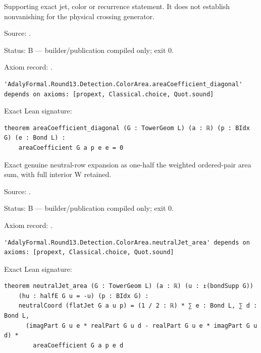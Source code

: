 \begin{theorem}[bp-538]
\label{bp-538}
\leanok
Supporting exact jet, color or recurrence statement. It does not establish nonvanishing for the physical crossing generator.

\par Source: \texttt{}.
\par Status: B — builder/publication compiled only; exit 0.
\par Axiom record: \texttt{}.
\begin{verbatim}
'AdalyFormal.Round13.Detection.ColorArea.areaCoefficient_diagonal' depends on axioms: [propext, Classical.choice, Quot.sound]
\end{verbatim}
\par Exact Lean signature:
\begin{verbatim}
theorem areaCoefficient_diagonal (G : TowerGeom L) (a : ℝ) (p : BIdx G) (e : Bond L) :
    areaCoefficient G a p e e = 0
\end{verbatim}
\end{theorem}

\begin{theorem}[bp-539]
\label{bp-539}
\leanok
Exact genuine neutral-row expansion as one-half the weighted ordered-pair area sum, with full interior W retained.

\par Source: \texttt{}.
\par Status: B — builder/publication compiled only; exit 0.
\par Axiom record: \texttt{}.
\begin{verbatim}
'AdalyFormal.Round13.Detection.ColorArea.neutralJet_area' depends on axioms: [propext, Classical.choice, Quot.sound]
\end{verbatim}
\par Exact Lean signature:
\begin{verbatim}
theorem neutralJet_area (G : TowerGeom L) (a : ℝ) (u : ↥(bondSupp G))
    (hu : halfE G u = -u) (p : BIdx G) :
    neutralCoord (flatJet G a u p) = (1 / 2 : ℝ) * ∑ e : Bond L, ∑ d : Bond L,
      (imagPart G u e * realPart G u d - realPart G u e * imagPart G u d) *
        areaCoefficient G a p e d
\end{verbatim}
\end{theorem}


